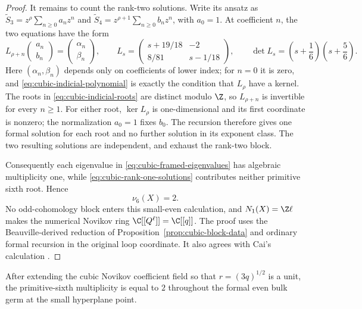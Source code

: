 \begin{proof}
It remains to count the rank-two solutions.  Write its ansatz as
\(\widetilde S_3=z^\rho\sum_{n\ge0}a_nz^n\) and
\(\widetilde S_4=z^{\rho+1}\sum_{n\ge0}b_nz^n\), with \(a_0=1\).
At coefficient \(n\), the two equations have the form
\[
 L_{\rho+n}\begin{pmatrix}a_n\\b_n\end{pmatrix}
 =\begin{pmatrix}\alpha_n\\\beta_n\end{pmatrix},
 \qquad
 L_s=
 \begin{pmatrix}
 s+19/18&-2\\
 8/81&s-1/18
 \end{pmatrix},
 \qquad
 \det L_s=\left(s+\frac16\right)\left(s+\frac56\right).
 \label{eq:cubic-frobenius-recursion}
\]
Here \((\alpha_n,\beta_n)\) depends only on coefficients of lower index;
for \(n=0\) it is zero, and \eqref{eq:cubic-indicial-polynomial} is exactly
the condition that \(L_\rho\) have a kernel.  The roots in
\eqref{eq:cubic-indicial-roots} are distinct modulo \(\Z\), so
\(L_{\rho+n}\) is invertible for every \(n\ge1\).  For either root,
\(\ker L_\rho\) is one-dimensional and its first coordinate is nonzero;
the normalization \(a_0=1\) fixes \(b_0\).  The recursion therefore gives
one formal solution for each root and no further solution in its exponent
class.  The two resulting solutions are independent, and exhaust the
rank-two block.

Consequently each eigenvalue in \eqref{eq:cubic-framed-eigenvalues} has
algebraic multiplicity one, while
\eqref{eq:cubic-rank-one-solutions} contributes neither primitive sixth root.
Hence
\[
 \nu_6(X)=2.
 \label{eq:cubic-packet-internal-count}
\]
No odd-cohomology block enters this small-even calculation, and
\(N_1(X)=\Z\ell\) makes the numerical Novikov ring
\(\C[[Q^\ell]]=\C[[q]]\).  The proof uses the Beauville-derived reduction of
Proposition~\ref{prop:cubic-block-data} and ordinary formal recursion in the
original loop coordinate.  It also agrees with Cai's calculation
\cite[pp.~5--6]{Cai}.

\end{proof}

\begin{corollary}
\label{cor:cubic-formal-germ}
%
%
After extending the cubic Novikov coefficient field so that
$r=(3q)^{1/2}$ is a unit, the primitive-sixth multiplicity is equal to $2$
throughout the formal even bulk germ at the small hyperplane point.
\end{corollary}

